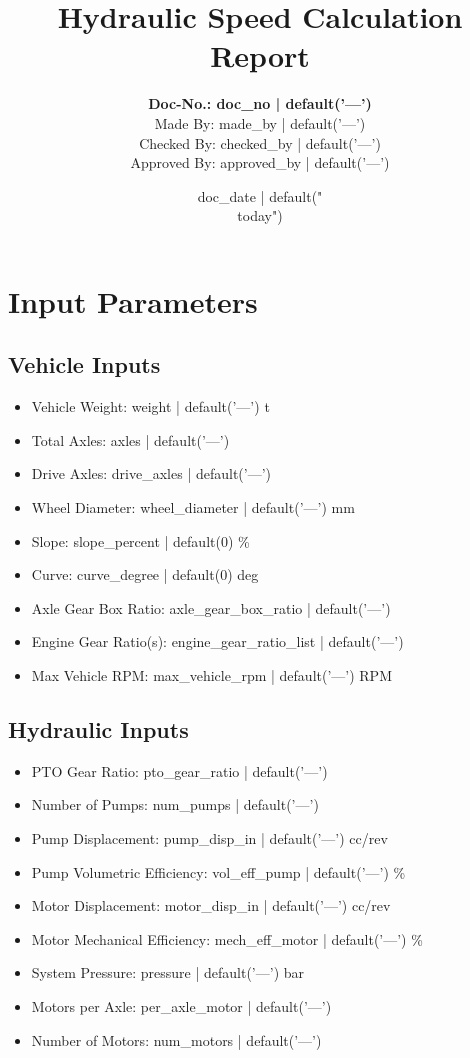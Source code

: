 \documentclass[14pt]{article}
\title{\textbf{Hydraulic Speed Calculation Report}}
\author{
\textbf{Doc-No.: {{ doc_no | default('---') }}}\\
Made By: {{ made_by | default('---') }}\\
Checked By: {{ checked_by | default('---') }}\\
Approved By: {{ approved_by | default('---') }}
}
\date{{ doc_date | default("\\today") }}
\begin{document}
\maketitle

\section*{Input Parameters}

\subsection*{Vehicle Inputs}
\begin{itemize}
  \item Vehicle Weight: {{ weight | default('---') }} t
  \item Total Axles: {{ axles | default('---') }}
  \item Drive Axles: {{ drive_axles | default('---') }}
  \item Wheel Diameter: {{ wheel_diameter | default('---') }} mm
  \item Slope: {{ slope_percent | default(0) }} \%
  \item Curve: {{ curve_degree | default(0) }} deg
  \item Axle Gear Box Ratio: {{ axle_gear_box_ratio | default('---') }}
  \item Engine Gear Ratio(s): {{ engine_gear_ratio_list | default('---') }}
  \item Max Vehicle RPM: {{ max_vehicle_rpm | default('---') }} RPM
\end{itemize}

\subsection*{Hydraulic Inputs}
\begin{itemize}
  \item PTO Gear Ratio: {{ pto_gear_ratio | default('---') }}
  \item Number of Pumps: {{ num_pumps | default('---') }}
  \item Pump Displacement: {{ pump_disp_in | default('---') }} cc/rev
  \item Pump Volumetric Efficiency: {{ vol_eff_pump | default('---') }} \%
  \item Motor Displacement: {{ motor_disp_in | default('---') }} cc/rev
  \item Motor Mechanical Efficiency: {{ mech_eff_motor | default('---') }} \%
  \item System Pressure: {{ pressure | default('---') }} bar
  \item Motors per Axle: {{ per_axle_motor | default('---') }}
  \item Number of Motors: {{ num_motors | default('---') }}
\end{itemize}
\end{document}
